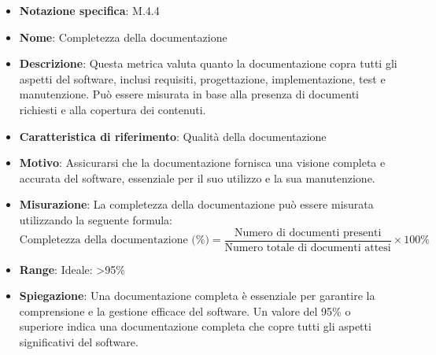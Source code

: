 \begin{itemize}
    \item \textbf{Notazione specifica}: M.4.4
    \item \textbf{Nome}: Completezza della documentazione
    \item \textbf{Descrizione}: Questa metrica valuta quanto la documentazione copra tutti gli aspetti del software, inclusi requisiti, progettazione, implementazione, test e manutenzione. Può essere misurata in base alla presenza di documenti richiesti e alla copertura dei contenuti.
    \item \textbf{Caratteristica di riferimento}: Qualità della documentazione
    \item \textbf{Motivo}: Assicurarsi che la documentazione fornisca una visione completa e accurata del software, essenziale per il suo utilizzo e la sua manutenzione.
    \item \textbf{Misurazione}: La completezza della documentazione può essere misurata utilizzando la seguente formula:
    \[ \text{Completezza della documentazione (\%)} = \frac{\text{Numero di documenti presenti}}{\text{Numero totale di documenti attesi}} \times 100\% \]
    \item \textbf{Range}: Ideale: >95\%
    \item \textbf{Spiegazione}: Una documentazione completa è essenziale per garantire la comprensione e la gestione efficace del software. Un valore del 95\% o superiore indica una documentazione completa che copre tutti gli aspetti significativi del software.
\end{itemize}
